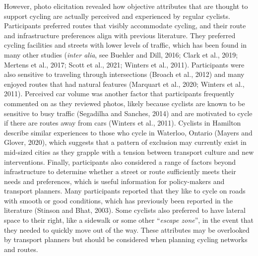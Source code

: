 \documentclass[]{elsarticle} %
\begin{document}
However, photo elicitation revealed how objective attributes that are
thought to support cycling are actually perceived and experienced by
regular cyclists. Participants preferred routes that visibly accommodate
cycling, and their route and infrastructure preferences align with
previous literature. They preferred cycling facilities and streets with
lower levels of traffic, which has been found in many other studies
(\emph{inter alia}, see Buehler and Dill, 2016; Clark et al., 2019;
Mertens et al., 2017; Scott et al., 2021; Winters et al., 2011).
Participants were also sensitive to traveling through intersections
(Broach et al., 2012) and many enjoyed routes that had natural features
(Marquart et al., 2020; Winters et al., 2011). Perceived car volume was
another factor that participants frequently commented on as they
reviewed photos, likely because cyclists are known to be sensitive to
busy traffic (Segadilha and Sanches, 2014) and are motivated to cycle if
there are routes away from cars (Winters et al., 2011). Cyclists in
Hamilton describe similar experiences to those who cycle in Waterloo,
Ontario (Mayers and Glover, 2020), which suggests that a pattern of
exclusion may currently exist in mid-sized cities as they grapple with a
tension between transport culture and new interventions. Finally,
participants also considered a range of factors beyond infrastructure to
determine whether a street or route sufficiently meets their needs and
preferences, which is useful information for policy-makers and transport
planners. Many participants reported that they like to cycle on roads
with smooth or good conditions, which has previously been reported in
the literature (Stinson and Bhat, 2003). Some cyclists also preferred to
have lateral space to their right, like a sidewalk or some other
``\emph{escape zone}'', in the event that they needed to quickly move
out of the way. These attributes may be overlooked by transport planners
but should be considered when planning cycling networks and routes.
\end{document}
